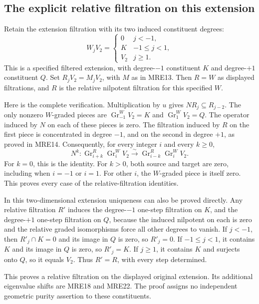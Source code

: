 \subsection{The explicit relative filtration on this extension}

Retain the extension filtration with its two induced constituent degrees:
\[
 W_jV_2=
 \begin{cases}
 0&j<-1,\\K&-1\leq j<1,\\V_2&j\geq1.
 \end{cases}
 \tag{MRE28}
\]
This is a specified filtered extension, with degree-\(-1\) constituent
\(K\) and degree-\(+1\) constituent \(Q\). Set \(R_jV_2=M_jV_2\), with
\(M\) as in MRE13. Then \(R=W\) as displayed filtrations, and \(R\) is
the relative nilpotent filtration for this specified \(W\).

Here is the complete verification. Multiplication by \(u\) gives
\(NR_j\subseteq R_{j-2}\). The only nonzero \(W\)-graded pieces are
\(\operatorname{Gr}_{-1}^W V_2=K\) and
\(\operatorname{Gr}_{1}^W V_2=Q\). The operator induced by \(N\) on
each of these pieces is zero. The filtration induced by \(R\) on the
first piece is concentrated in degree \(-1\), and on the second in
degree \(+1\), as proved in MRE14. Consequently, for every integer
\(i\) and every \(k\geq0\),
\[
 N^k:\operatorname{Gr}_{i+k}^R\operatorname{Gr}_i^W V_2
 \xrightarrow{\sim}
       \operatorname{Gr}_{i-k}^R\operatorname{Gr}_i^W V_2.
 \tag{MRE29}
\]
For \(k=0\), this is the identity. For \(k>0\), both source and target
are zero, including when \(i=-1\) or \(i=1\). For other \(i\), the
\(W\)-graded piece is itself zero. This proves every case of the
relative-filtration identities.

In this two-dimensional extension uniqueness can also be proved directly.
Any relative filtration \(R'\) induces the degree-\(-1\) one-step
filtration on \(K\), and the degree-\(+1\) one-step filtration on \(Q\),
because the induced nilpotent on each is zero and the relative graded
isomorphisms force all other degrees to vanish. If \(j<-1\), then
\(R'_j\cap K=0\) and its image in \(Q\) is zero, so \(R'_j=0\).
If \(-1\leq j<1\), it contains \(K\) and its image in \(Q\) is zero,
so \(R'_j=K\). If \(j\geq1\), it contains \(K\) and surjects onto
\(Q\), so it equals \(V_2\). Thus \(R'=R\), with every step determined.

This proves a relative filtration on the displayed original extension.
Its additional eigenvalue shifts are MRE18 and MRE22. The proof assigns
no independent geometric purity assertion to these constituents.

